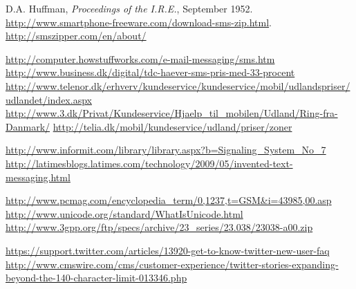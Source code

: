  D.A. Huffman, {\it Proceedings of the I.R.E.}, September 1952.
 {\url{http://www.smartphone-freeware.com/download-sms-zip.html}}.
 {\url{http://smszipper.com/en/about/}}

 {\url{http://computer.howstuffworks.com/e-mail-messaging/sms.htm}}
 {\url{http://www.business.dk/digital/tdc-haever-sms-pris-med-33-procent}}
 {\url{http://www.telenor.dk/erhverv/kundeservice/kundeservice/mobil/udlandspriser/udlandet/index.aspx}}
 {\url{http://www.3.dk/Privat/Kundeservice/Hjaelp_til_mobilen/Udland/Ring-fra-Danmark/}}
 {\url{http://telia.dk/mobil/kundeservice/udland/priser/zoner}}

 {\url{http://www.informit.com/library/library.aspx?b=Signaling_System_No_7}}
 {\url{http://latimesblogs.latimes.com/technology/2009/05/invented-text-messaging.html}}

 {\url{http://www.pcmag.com/encyclopedia_term/0,1237,t=GSM&i=43985,00.asp}}
 {\url{http://www.unicode.org/standard/WhatIsUnicode.html}}
 {\url{http://www.3gpp.org/ftp/specs/archive/23_series/23.038/23038-a00.zip}}


 {\url{https://support.twitter.com/articles/13920-get-to-know-twitter-new-user-faq}}
 {\url{http://www.cmswire.com/cms/customer-experience/twitter-stories-expanding-beyond-the-140-character-limit-013346.php}}


